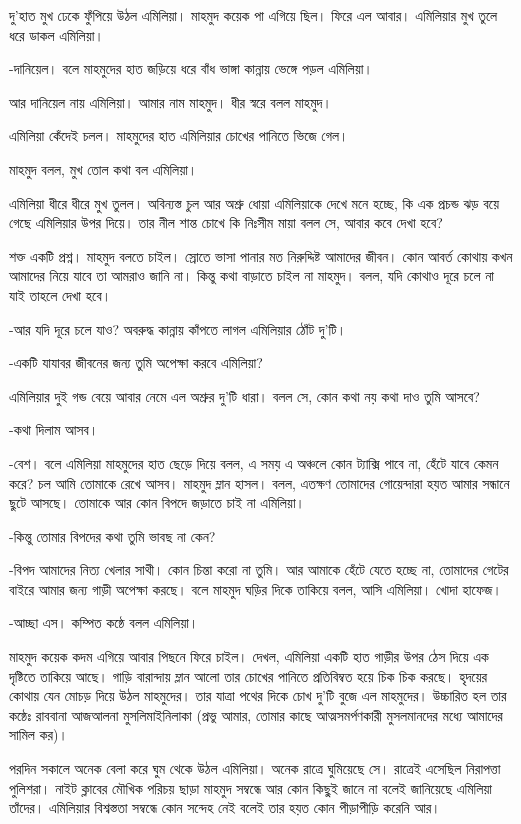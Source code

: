 \documentclass[
]{book}
\begin{document}
দু'হাত মুখ ঢেকে ফুঁপিয়ে উঠল এমিলিয়া। মাহমুদ কয়েক পা এগিয়ে ছিল। ফিরে এল আবার। এমিলিয়ার মুখ তুলে ধরে ডাকল এমিলিয়া।

-দানিয়েল। বলে মাহমুদের হাত জড়িয়ে ধরে বাঁধ ভাঙ্গা কান্নায় ভেঙ্গে পড়ল এমিলিয়া।

আর দানিয়েল নায় এমিলিয়া। আমার নাম মাহমুদ। ধীর স্বরে বলল মাহমুদ।

এমিলিয়া কেঁদেই চলল। মাহমুদের হাত এমিলিয়ার চোখের পানিতে ভিজে গেল।

মাহমুদ বলল, মুখ তোল কথা বল এমিলিয়া।

এমিলিয়া ধীরে ধীরে মুখ তুলল। অবিন্যস্ত চুল আর অশ্রু ধোয়া এমিলিয়াকে দেখে মনে হচ্ছে, কি এক প্রচন্ড ঝড় বয়ে গেছে এমিলিয়ার উপর দিয়ে। তার নীল শান্ত চোখে কি নিঃসীম মায়া বলল সে, আবার কবে দেখা হবে?

শক্ত একটি প্রশ্ন। মাহমুদ বলতে চাইল। স্রোতে ভাসা পানার মত নিরুদ্দিষ্ট আমাদের জীবন। কোন আবর্ত কোথায় কখন আমাদের নিয়ে যাবে তা আমরাও জানি না। কিন্তু কথা বাড়াতে চাইল না মাহমুদ। বলল, যদি কোথাও দূরে চলে না যাই তাহলে দেখা হবে।

-আর যদি দূরে চলে যাও? অবরুদ্ধ কান্নায় কাঁপতে লাগল এমিলিয়ার ঠোঁট দু'টি।

-একটি যাযাবর জীবনের জন্য তুমি অপেক্ষা করবে এমিলিয়া?

এমিলিয়ার দুই গন্ড বেয়ে আবার নেমে এল অশ্রুর দু'টি ধারা। বলল সে, কোন কথা নয় কথা দাও তুমি আসবে?

-কথা দিলাম আসব।

-বেশ। বলে এমিলিয়া মাহমুদের হাত ছেড়ে দিয়ে বলল, এ সময় এ অঞ্চলে কোন ট্যাক্সি পাবে না, হেঁটে যাবে কেমন করে? চল আমি তোমাকে রেখে আসব। মাহমুদ ম্লান হাসল। বলল, এতক্ষণ তোমাদের গোয়েন্দারা হয়ত আমার সন্ধানে ছুটে আসছে। তোমাকে আর কোন বিপদে জড়াতে চাই না এমিলিয়া।

-কিন্তু তোমার বিপদের কথা তুমি ভাবছ না কেন?

-বিপদ আমাদের নিত্য খেলার সাথী। কোন চিন্তা করো না তুমি। আর আমাকে হেঁটে যেতে হচ্ছে না, তোমাদের গেটের বাইরে আমার জন্য গাড়ী অপেক্ষা করছে। বলে মাহমুদ ঘড়ির দিকে তাকিয়ে বলল, আসি এমিলিয়া। খোদা হাফেজ।

-আচ্ছা এস। কম্পিত কন্ঠে বলল এমিলিয়া।

মাহমুদ কয়েক কদম এগিয়ে আবার পিছনে ফিরে চাইল। দেখল, এমিলিয়া একটি হাত গাড়ীর উপর ঠেস দিয়ে এক দৃষ্টিতে তাকিয়ে আছে। গাড়ি বারান্দায় ম্লান আলো তার চোখের পানিতে প্রতিবিম্বত হয়ে চিক চিক করছে। হৃদয়ের কোথায় যেন মোচড় দিয়ে উঠল মাহমুদের। তার যাত্রা পথের দিকে চোখ দু'টি বুজে এল মাহমুদের। উচ্চারিত হল তার কন্ঠেঃ রাববানা আজআলনা মুসলিমাইনিলাকা (প্রভু আমার, তোমার কাছে আত্মসমর্পণকারী মুসলমানদের মধ্যে আমাদের সামিল কর)।

পরদিন সকালে অনেক বেলা করে ঘুম থেকে উঠল এমিলিয়া। অনেক রাত্রে ঘুমিয়েছে সে। রাত্রেই এসেছিল নিরাপত্তা পুলিশরা। নাইট ক্লাবের মৌখিক পরিচয় ছাড়া মাহমুদ সম্বন্ধে আর কোন কিছু্ই জানে না বলেই জানিয়েছে এমিলিয়া তাঁদের। এমিলিয়ার বিশ্বস্ততা সম্বন্ধে কোন সন্দেহ নেই বলেই তার হয়ত কোন পীড়াপীড়ি করেনি আর।
\end{document}
